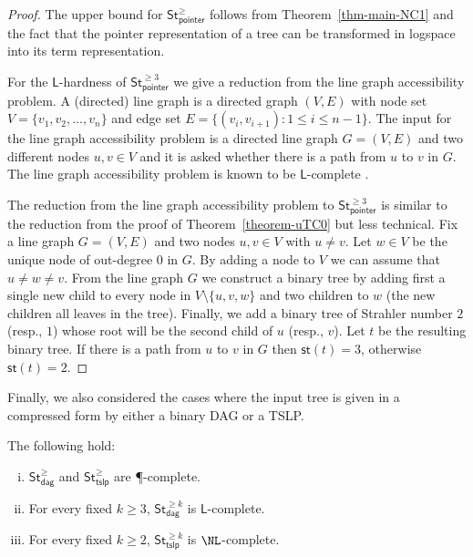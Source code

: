 \documentclass[a4paper,UKenglish,cleveref, autoref, thm-restate, numberwithinsect]{lipics-v2021}
\newcommand{\hs}{\mathsf{st}}
\newcommand{\LS}{\mathsf{L}}
\newcommand{\StN}{\mathsf{St}^\ge}
\newcommand{\StNk}{\mathsf{St}^{\ge k}}
\newcommand{\StNpointer}{\StN_{\mathsf{pointer}}}
\newcommand{\StNdag}{\StN_{\mathsf{dag}}}
\newcommand{\StNtslp}{\StN_{\mathsf{tslp}}}
\newcommand{\StNkdag}{\StNk_{\mathsf{dag}}}
\newcommand{\StNktslp}{\StNk_{\mathsf{tslp}}}
\begin{document}
\begin{proof}
The  upper bound for $\StNpointer$ follows from Theorem~\ref{thm-main-NC1} and the fact that the pointer representation
of a tree can be transformed in logspace into its term representation.

For the $\LS$-hardness of $\mathsf{St}_{\mathsf{pointer}}^{\ge 3}$ we give a reduction from the line graph accessibility problem.
A (directed) line graph is a directed graph $(V,E)$ with node set $V = \{v_1, v_2, \ldots, v_n\}$ and edge set $E=\{ (v_i, v_{i+1}) : 1 \le i \le n-1\}$.
The input for the line graph accessibility problem is a directed line graph $G=(V,E)$ and two different nodes $u,v \in V$ and it is asked whether there is
a path from $u$ to $v$ in $G$.
The line graph accessibility problem is known to be $\LS$-complete \cite{Etessami97}.

The reduction from the line graph accessibility problem to $\mathsf{St}_{\mathsf{pointer}}^{\ge 3}$ is similar to the reduction from the proof of 
Theorem~\ref{theorem-uTC0} but less technical.
Fix a line graph $G=(V,E)$ and two nodes $u, v \in V$ with $u \neq v$.  
Let $w \in V$ be the unique node of out-degree $0$ in $G$.
By adding a node to $V$ we can assume that $u \neq w \neq v$. 
From the line graph $G$ we construct a binary tree by adding first a single new child to every
node in $V \setminus \{ u, v, w\}$ and two children to $w$ (the new children all leaves in the tree).
 Finally, we add a binary tree of Strahler number $2$ (resp., $1$) whose root will be the second
child of $u$ (resp., $v$). Let $t$ be the resulting binary tree. If there is a path from $u$ to $v$ in 
$G$ then $\hs(t) = 3$, otherwise $\hs(t) = 2$.
\end{proof}
Finally, we also considered the cases where the input tree is given in a compressed form by either a binary DAG or a TSLP.

\begin{theorem} \label{thm-compressed} The following hold:
\begin{enumerate}[(i)]
\item $\StNdag$ and $\StNtslp$ are \P-complete.
\item For every fixed $k \geq 3$,  $\StNkdag$ is $\LS$-complete. 
\item For every fixed $k \geq 2$,  $\StNktslp$ is $\NL$-complete. 
\end{enumerate}
\end{theorem}
\end{document}

